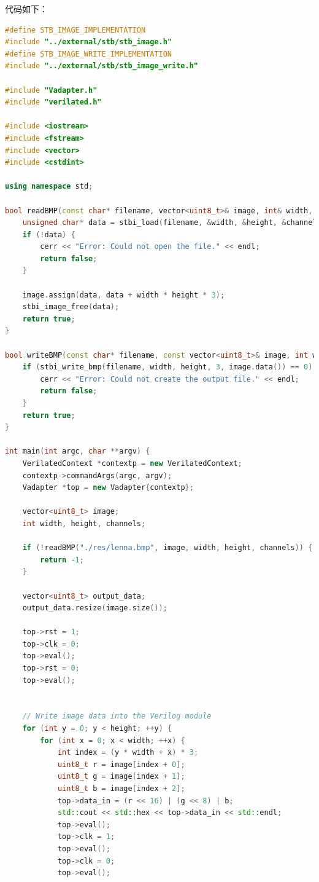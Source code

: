 \documentclass[12pt, a4paper]{article}
\begin{document}
代码如下：
\begin{lstlisting}[language=c++]
#define STB_IMAGE_IMPLEMENTATION
#include "../external/stb/stb_image.h"
#define STB_IMAGE_WRITE_IMPLEMENTATION
#include "../external/stb/stb_image_write.h"

#include "Vadapter.h"
#include "verilated.h"

#include <iostream>
#include <fstream>
#include <vector>
#include <cstdint>

using namespace std;

bool readBMP(const char* filename, vector<uint8_t>& image, int& width, int& height, int& channels) {
    unsigned char* data = stbi_load(filename, &width, &height, &channels, 3);
    if (!data) {
        cerr << "Error: Could not open the file." << endl;
        return false;
    }

    image.assign(data, data + width * height * 3);
    stbi_image_free(data);
    return true;
}

bool writeBMP(const char* filename, const vector<uint8_t>& image, int width, int height) {
    if (stbi_write_bmp(filename, width, height, 3, image.data()) == 0) {
        cerr << "Error: Could not create the output file." << endl;
        return false;
    }
    return true;
}

int main(int argc, char **argv) {
    VerilatedContext *contextp = new VerilatedContext;
    contextp->commandArgs(argc, argv);
    Vadapter *top = new Vadapter{contextp};

    vector<uint8_t> image;
    int width, height, channels;

    if (!readBMP("./res/lenna.bmp", image, width, height, channels)) {
        return -1;
    }

    vector<uint8_t> output_data;
    output_data.resize(image.size());

    top->rst = 1;
    top->clk = 0;
    top->eval();
    top->rst = 0;
    top->eval();


    // Write image data into the Verilog module
    for (int y = 0; y < height; ++y) {
        for (int x = 0; x < width; ++x) {
            int index = (y * width + x) * 3;
            uint8_t r = image[index + 0];
            uint8_t g = image[index + 1];
            uint8_t b = image[index + 2];
            top->data_in = (r << 16) | (g << 8) | b;
            std::cout << std::hex << top->data_in << std::endl;
            top->eval();
            top->clk = 1;
            top->eval();
            top->clk = 0;
            top->eval();


\end{lstlisting}
\end{document}
